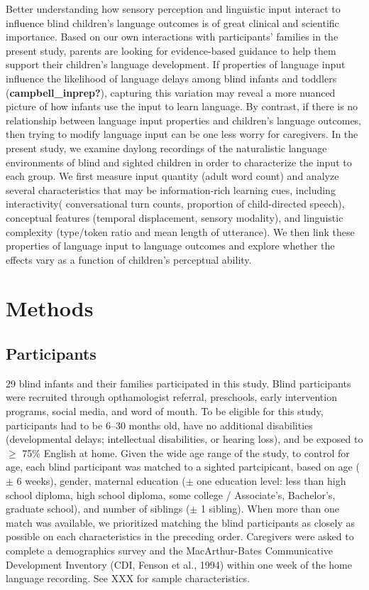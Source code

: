 \documentclass[
  man,floatsintext]{apa6}
\begin{document}
Better understanding how sensory perception and linguistic input interact to influence blind children's language outcomes is of great clinical and scientific importance. Based on our own interactions with participants' families in the present study, parents are looking for evidence-based guidance to help them support their children's language development. If properties of language input influence the likelihood of language delays among blind infants and toddlers (\textbf{campbell\_inprep?}), capturing this variation may reveal a more nuanced picture of how infants use the input to learn language. By contrast, if there is no relationship between language input properties and children's language outcomes, then trying to modify language input can be one less worry for caregivers. In the present study, we examine daylong recordings of the naturalistic language environments of blind and sighted children in order to characterize the input to each group. We first measure input quantity (adult word count) and analyze several characteristics that may be information-rich learning cues, including interactivity( conversational turn counts, proportion of child-directed speech), conceptual features (temporal displacement, sensory modality), and linguistic complexity (type/token ratio and mean length of utterance). We then link these properties of language input to language outcomes and explore whether the effects vary as a function of children's perceptual ability.

\hypertarget{methods}{%
\section{Methods}\label{methods}}

\hypertarget{participants}{%
\subsection{Participants}\label{participants}}

29 blind infants and their families participated in this study. Blind participants were recruited through opthamologist referral, preschools, early intervention programs, social media, and word of mouth. To be eligible for this study, participants had to be 6--30 months old, have no additional disabilities (developmental delays; intellectual disabilities, or hearing loss), and be exposed to \(\geq\) 75\% English at home. Given the wide age range of the study, to control for age, each blind participant was matched to a sighted partcipicant, based on age (\(\pm\) 6 weeks), gender, maternal education (\(\pm\) one education level: less than high school diploma, high school diploma, some college / Associate's, Bachelor's, graduate school), and number of siblings (\(\pm\) 1 sibling). When more than one match was available, we prioritized matching the blind participants as closely as possible on each characteristics in the preceding order. Caregivers were asked to complete a demographics survey and the MacArthur-Bates Communicative Development Inventory (CDI, Fenson et al., 1994) within one week of the home language recording. See XXX for sample characteristics.
\end{document}
